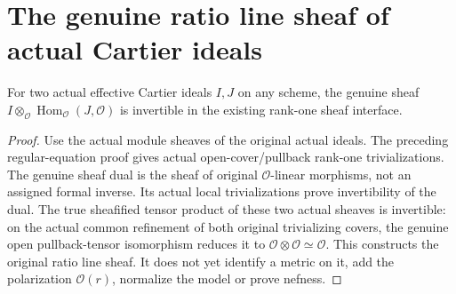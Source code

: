 \section{The genuine ratio line sheaf of actual Cartier ideals}

\begin{lemma}
\label{lem:actual-cartier-ratio-line-sheaf}
\leanok
For two actual effective Cartier ideals $I,J$ on any scheme, the genuine
sheaf $I\otimes_{\mathcal O}\operatorname{Hom}_{\mathcal O}(J,\mathcal O)$
is invertible in the existing rank-one sheaf interface.
\end{lemma}
\begin{proof}
Use the actual module sheaves of the original actual ideals. The preceding
regular-equation proof gives actual open-cover/pullback rank-one
trivializations. The genuine sheaf dual is the sheaf of original
$\mathcal O$-linear morphisms, not an assigned formal inverse. Its
actual local trivializations prove invertibility of the dual.
The true sheafified tensor product of these two actual sheaves is
invertible: on the actual common refinement of both original trivializing
covers, the genuine open pullback-tensor isomorphism reduces it to
$\mathcal O\otimes\mathcal O\simeq\mathcal O$. This constructs the
original ratio line sheaf. It does not yet identify a metric on it,
add the polarization $\mathcal O(r)$, normalize the model or prove nefness.
\end{proof}
